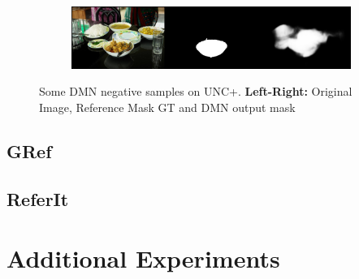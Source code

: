 \begin{figure}[!htbp]
    \begin{subfigure}[b]{\columnwidth}
            \centering
            \includegraphics[width=\textwidth]{./figures/unc_plus_samples/4_neg.png}
    \end{subfigure}
    \caption{Some DMN negative samples on UNC+. \textbf{Left-Right:} Original Image, Reference Mask GT and DMN output mask}
    \label{Fig:UNC+_Neg}
\end{figure}


\FloatBarrier
\subsection*{GRef}
\subsection*{ReferIt}

\section{Additional Experiments}